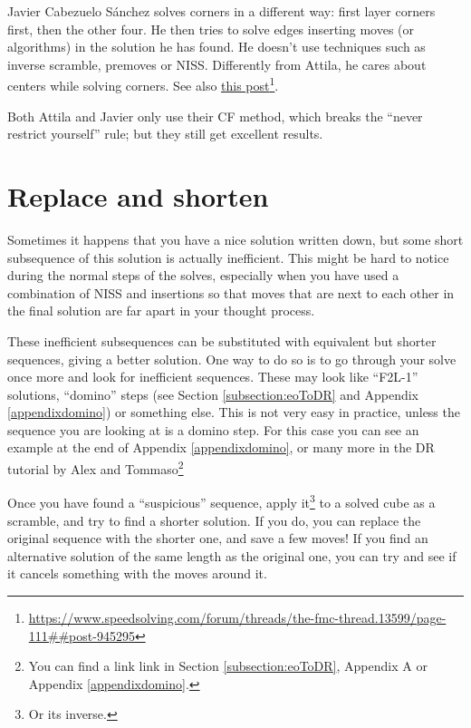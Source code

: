 \documentclass[11pt,a4paper]{book}
\begin{document}
Javier Cabezuelo Sánchez solves corners in a different way: first layer corners first, then the other four. He then tries to solve edges inserting moves (or algorithms) in the solution he has found. He doesn't use techniques such as inverse scramble, premoves or NISS. Differently from Attila, he cares about centers while solving corners. See also \href{https://www.speedsolving.com/forum/threads/the-fmc-thread.13599/page-111##post-945295}{this post}\footnote{\url{https://www.speedsolving.com/forum/threads/the-fmc-thread.13599/page-111##post-945295}}.

Both Attila and Javier only use their CF method, which breaks the ``never restrict yourself'' rule; but they still get excellent results.

\section{Replace and shorten}
\label{sec:replace}

Sometimes it happens that you have a nice solution written down, but some short subsequence of this solution is actually inefficient. This might be hard to notice during the normal steps of the solves, especially when you have used a combination of NISS and insertions so that moves that are next to each other in the final solution are far apart in your thought process.

These inefficient subsequences can be substituted with equivalent but shorter sequences, giving a better solution. One way to do so is to go through your solve once more and look for inefficient sequences. These may look like ``F2L-1'' solutions, ``domino'' steps (see Section \ref{subsection:eoToDR} and Appendix \ref{appendixdomino}) or something else. This is not very easy in practice, unless the sequence you are looking at is a domino step. For this case you can see an example at the end of Appendix \ref{appendixdomino}, or many more in the DR tutorial by Alex and Tommaso\footnote{You can find a link link in Section \ref{subsection:eoToDR}, Appendix A or Appendix \ref{appendixdomino}.}

Once you have found a ``suspicious'' sequence, apply it\footnote{Or its inverse.} to a solved cube as a scramble, and try to find a shorter solution. If you do, you can replace the original sequence with the shorter one, and save a few moves! If you find an alternative solution of the same length as the original one, you can try and see if it cancels something with the moves around it.
\end{document}
